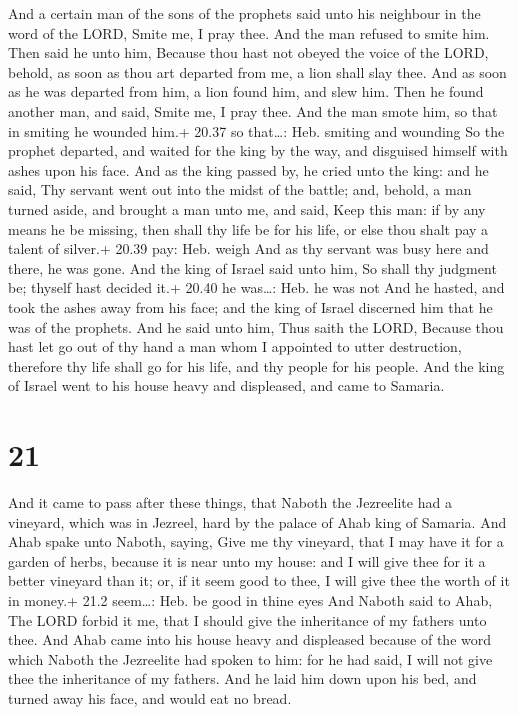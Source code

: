  And a certain man of the sons of the prophets said unto
his neighbour in the word of the LORD, Smite me, I pray thee. And the
man refused to smite him.  Then said he unto him, Because
thou hast not obeyed the voice of the LORD, behold, as soon as thou art
departed from me, a lion shall slay thee. And as soon as he was departed
from him, a lion found him, and slew him.  Then he found
another man, and said, Smite me, I pray thee. And the man smote him, so
that in smiting he wounded him.+ 20.37 so that\ldots: Heb. smiting and
wounding  So the prophet departed, and waited for the king
by the way, and disguised himself with ashes upon his face.
 And as the king passed by, he cried unto the king: and he
said, Thy servant went out into the midst of the battle; and, behold, a
man turned aside, and brought a man unto me, and said, Keep this man: if
by any means he be missing, then shall thy life be for his life, or else
thou shalt pay a talent of silver.+ 20.39 pay: Heb. weigh 
And as thy servant was busy here and there, he was gone. And the king of
Israel said unto him, So shall thy judgment be; thyself hast decided
it.+ 20.40 he was\ldots: Heb. he was not  And he hasted,
and took the ashes away from his face; and the king of Israel discerned
him that he was of the prophets.  And he said unto him,
Thus saith the LORD, Because thou hast let go out of thy hand a man whom
I appointed to utter destruction, therefore thy life shall go for his
life, and thy people for his people.  And the king of
Israel went to his house heavy and displeased, and came to Samaria.

\hypertarget{section-20}{%
\section{21}\label{section-20}}

 And it came to pass after these things, that Naboth the
Jezreelite had a vineyard, which was in Jezreel, hard by the palace of
Ahab king of Samaria.  And Ahab spake unto Naboth, saying,
Give me thy vineyard, that I may have it for a garden of herbs, because
it is near unto my house: and I will give thee for it a better vineyard
than it; or, if it seem good to thee, I will give thee the worth of it
in money.+ 21.2 seem\ldots: Heb. be good in thine eyes  And
Naboth said to Ahab, The LORD forbid it me, that I should give the
inheritance of my fathers unto thee.  And Ahab came into his
house heavy and displeased because of the word which Naboth the
Jezreelite had spoken to him: for he had said, I will not give thee the
inheritance of my fathers. And he laid him down upon his bed, and turned
away his face, and would eat no bread.

